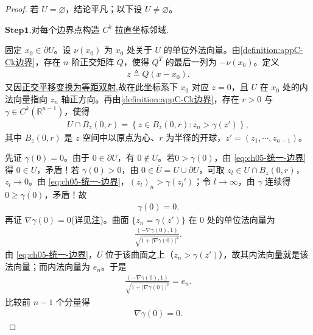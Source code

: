 \documentclass[../../main.tex]{subfiles}
\begin{document}
\begin{proof}

若 $U=\varnothing$，结论平凡；以下设 $U\neq\varnothing$。

\noindent$\mathbf{Step}\bm{1}$.{\heiti 对每个边界点构造 $C^{k}$ 拉直坐标邻域.}

固定 $x_0\in\partial U$。设 $\nu(x_0)$ 为 $x_0$ 处关于 $U$ 的单位外法向量。由\cref{definition:appC-Ck边界}，存在 $n$ 阶正交矩阵 $Q$，使得 $Q^{T}$ 的最后一列为 $-\nu(x_0)$。定义
\begin{align}
z\triangleq Q(x-x_0).
\label{eq:ch05-统一-坐标}
\end{align}
又因\hyperref[lemma:正交平移变换为等距双射]{正交平移变换为等距双射},故在此坐标系下 $x_0$ 对应 $z=0$，且 $U$ 在 $x_0$ 处的内法向量指向 $z_n$ 轴正方向。再由\cref{definition:appC-Ck边界}，存在 $r>0$ 与 $\gamma\in C^{k}(\mathbb{R}^{n-1})$，使得
\begin{align}
U\cap B_z(0,r)=\left\{z\in B_z(0,r):z_n>\gamma(z')\right\},
\label{eq:ch05-统一-边界}
\end{align}
其中 $B_z(0,r)$ 是 $z$ 空间中以原点为心、$r$ 为半径的开球，$z'=(z_1,\cdots,z_{n-1})$。

先证 $\gamma(0)=0$。由于 $0\in\partial U$，有 $0\notin U$。若$0>\gamma(0)$，由 \eqref{eq:ch05-统一-边界} 得 $0\in U$，矛盾！若 $\gamma(0)>0$，由 $0\in\overline{U}=U\cup \partial U$，可取 $z_l\in U\cap B_z(0,r)$，$z_l\to0$。由 \eqref{eq:ch05-统一-边界}，$(z_l)_n>\gamma(z_l')$；令 $l\to\infty$，由 $\gamma$ 连续得 $0\geqslant\gamma(0)$，矛盾！故
\begin{align}
\gamma(0)=0.
\label{eq:ch05-统一-gamma0}
\end{align}
再证 $\nabla\gamma(0)=0$(详见\hyperref[曲面的单位法向量选取]{注})。曲面 $\{z_n=\gamma(z')\}$ 在 $0$ 处的单位法向量为
\begin{align*}
\frac{(-\nabla\gamma(0),1)}{\sqrt{1+|\nabla\gamma(0)|^{2}}}.
\end{align*}
由 \eqref{eq:ch05-统一-边界}，$U$ 位于该曲面之上（$z_n>\gamma(z')$），故其内法向量就是该法向量；而内法向量为 $e_n$。于是
\begin{align*}
\frac{(-\nabla\gamma(0),1)}{\sqrt{1+|\nabla\gamma(0)|^{2}}}=e_n.
\end{align*}
比较前 $n-1$ 个分量得
\begin{align}
\nabla\gamma(0)=0.
\label{eq:ch05-统一-gradgamma0}
\end{align}


\end{proof}
\end{document}
